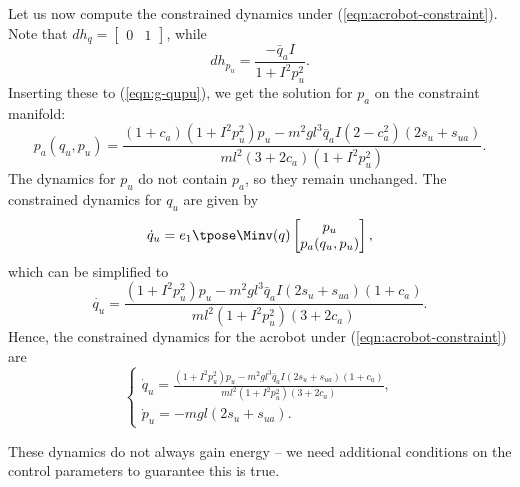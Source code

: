 Let us now compute the constrained dynamics under
(\ref{eqn:acrobot-constraint}).
Note that \(dh_q = \begin{bmatrix}0 & 1\end{bmatrix}\), while
\[
    dh_{p_u} = \frac{-\bar{q}_a I}{1 + I^2 p_u^2}
    .
\]
Inserting these to (\ref{eqn:g-qupu}), we get the solution for \(p_a\) on the
constraint manifold:
\[
    p_a(q_u,p_u) = \frac{
        (1+c_a)(1+I^2 p_u^2)p_u - m^2gl^3\bar{q}_a I (2-c_a^2)(2s_u + s_{ua})
    }{ml^2(3+2c_a)(1+I^2 p_u^2)}
    .
\]
The dynamics for \(p_u\) do not contain \(p_a\), so they remain unchanged.
The constrained dynamics for \(q_u\) are given by 
\begin{equation*}
    \dot{q}_u = e_1\tpose \Minv(q) \begin{bmatrix}
                    p_u \\ p_a(q_u,p_u)
                \end{bmatrix} %
    ,
\end{equation*}
which can be simplified to 
\begin{equation*}
    \dot{q_u} = \frac{(1+I^2 p_u^2)p_u - m^2gl^3\bar{q}_a I(2s_u + s_{ua})(1+c_a) }{ml^2(1+I^2 p_u^2)(3+2c_a)}
    .
\end{equation*}
Hence, the constrained dynamics for the acrobot under
(\ref{eqn:acrobot-constraint}) are
\begin{equation}\label{eqn:acrobot-constrained-dynamics}
    \begin{cases}
        \dot{q}_u = \frac{(1+I^2 p_u^2)p_u - m^2gl^3\bar{q}_a I(2s_u + s_{ua})(1+c_a) }
            {ml^2(1+I^2 p_u^2)(3+2c_a)}
        , \\
        \dot{p}_u = - m g l (2s_u + s_{ua})
        .
    \end{cases}
\end{equation}

These dynamics do not always gain energy -- we need additional conditions
on the control parameters to guarantee this is true.

